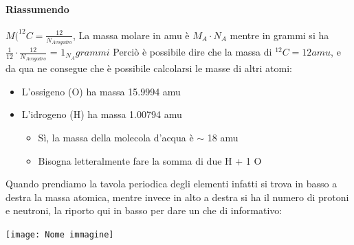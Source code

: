 \documentclass[12pt, a4paper, openany, oneside]{book}
\begin{document}
\paragraph{Riassumendo} $M(^{12}C = \frac{12}{N_{Avogadro}}$, La massa molare in amu è
$M_{A} \cdot N_{A}$  mentre in grammi si ha $\frac{1}{12} \cdot \frac{12}
{N_{Avogadro}}$ = $1_{N_{A}} grammi$
Perciò è possibile dire che la massa di $^{12}C = 12 amu$, e da qua ne consegue
che è possibile calcolarsi le masse di altri atomi:
\begin{itemize}
	\item L'ossigeno (O) ha massa 15.9994 amu
	\item L'idrogeno (H) ha massa 1.00794 amu
	\begin{itemize}
		\item Sì, la massa della molecola d'acqua è $\sim$ 18 amu
		\item Bisogna letteralmente fare la somma di due H + 1 O 
	\end{itemize}
\end{itemize}            
Quando prendiamo la tavola periodica degli elementi infatti si trova in basso 
a destra la massa atomica, mentre invece in alto a destra si ha il numero di
protoni e neutroni, la riporto qui in basso per dare un che di informativo:
\begin{center}
\texttt{[image: Nome immagine]}
\end{center}
\end{document}
